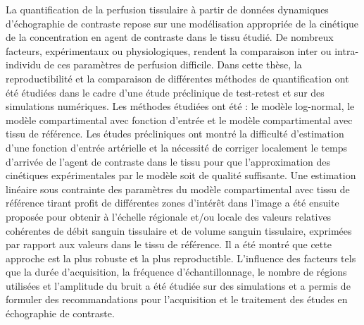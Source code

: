%
%
%
La quantification de la perfusion tissulaire \`a partir de donn\'ees dynamiques d'\'echographie de contraste repose sur une mod\'elisation appropri\'ee de la cin\'etique de la concentration en agent de contraste dans le tissu \'etudi\'e. De nombreux facteurs, exp\'erimentaux ou physiologiques, rendent la comparaison inter ou intra-individu de ces param\`etres de perfusion difficile.
Dans cette th\`ese, la reproductibilit\'e et la comparaison de diff\'erentes m\'ethodes de quantification ont \'et\'e \'etudi\'ees dans le cadre d'une \'etude pr\'eclinique de test-retest et sur des simulations num\'eriques. 
Les m\'ethodes \'etudi\'ees ont \'et\'e : le mod\`ele log-normal, le mod\`ele compartimental avec fonction d'entr\'ee et le mod\`ele compartimental avec tissu de r\'ef\'erence. Les \'etudes pr\'ecliniques ont montr\'e la difficult\'e d'estimation d'une fonction d'entr\'ee art\'erielle et la n\'ecessit\'e de corriger localement le temps d'arriv\'ee de l'agent de contraste dans le tissu pour que l'approximation des cin\'etiques exp\'erimentales par le mod\`ele soit de qualit\'e suffisante.
Une estimation lin\'eaire sous contrainte des param\`etres du mod\`ele compartimental avec tissu de r\'ef\'erence tirant profit de diff\'erentes zones d'int\'er\^et dans l'image a \'et\'e ensuite propos\'ee pour obtenir \`a l'\'echelle r\'egionale et/ou locale des valeurs relatives coh\'erentes de d\'ebit sanguin tissulaire et de volume sanguin tissulaire, exprim\'ees par rapport aux valeurs dans le tissu de r\'ef\'erence. Il a \'et\'e montr\'e que cette approche est la plus robuste et la plus reproductible. L'influence des facteurs tels que la dur\'ee d'acquisition, la fr\'equence d'\'echantillonnage, le nombre de r\'egions utilis\'ees et l'amplitude du bruit a \'et\'e \'etudi\'ee sur des simulations et a permis de formuler des recommandations pour l'acquisition et le traitement des \'etudes en \'echographie de contraste.
